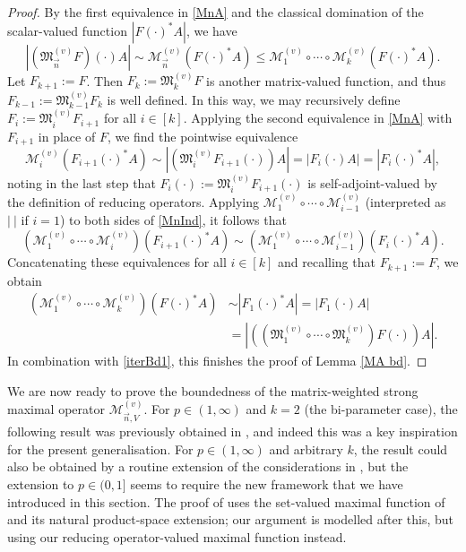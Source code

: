 \documentclass[11pt, reqno]{amsart}
\theoremstyle{definition}
\theoremstyle{remark}
\numberwithin{equation}{section}
\newcommand{\M}{\mathfrak M}
\newcommand{\vn}{\vec n}
\newcommand{\abs}[1]{|#1|}
\begin{document}
\begin{proof}
By the first equivalence in \eqref{MnA} and the classical domination of the scalar-valued function $\abs{F(\cdot)^*A}$, we have
\begin{equation}\label{iterBd1}
\abs{(\M_{\vn}^{(v)}F)(\cdot)A}
\sim \mathcal M_{\vn}^{(v)}(F(\cdot)^*A)
\leq \mathcal M_1^{(v)}\circ\cdots\circ \mathcal M_k^{(v)}(F(\cdot)^*A).
\end{equation}
Let $F_{k+1}:=F$. Then $F_k:=\M_k^{(v)}F$ is another matrix-valued function, and thus $F_{k-1}:=\M_{k-1}^{(v)}F_k$ is well defined. In this way, we may recursively define $F_i:=\M_i^{(v)} F_{i+1}$ for all $i\in[k]$.  Applying the second equivalence in \eqref{MnA} with $F_{i+1}$ in place of $F$, we find the pointwise equivalence
\begin{equation}\label{MnInd}
\mathcal M_i^{(v)}(F_{i+1}(\cdot)^*A)\sim\abs{(\M_i^{(v)}F_{i+1}(\cdot))A}=\abs{F_i(\cdot)A}
=\abs{F_i(\cdot)^*A},
\end{equation}
noting in the last step that $F_i(\cdot):=\M_i^{(v)}F_{i+1}(\cdot)$ is self-adjoint-valued by the definition of reducing operators. Applying $\mathcal M_1^{(v)}\circ\cdots\circ \mathcal M_{i-1}^{(v)}$ (interpreted as $\abs{\ }$ if $i=1$) to both sides of \eqref{MnInd}, it follows that
\begin{equation*}
(\mathcal M_1^{(v)}\circ\cdots\circ \mathcal M_i^{(v)})(F_{i+1}(\cdot)^*A)\sim
(\mathcal M_1^{(v)}\circ\cdots\circ \mathcal M_{i-1}^{(v)})(F_i(\cdot)^*A).
\end{equation*}
Concatenating these equivalences for all $i\in[k]$ and recalling that $F_{k+1}:=F$, we obtain
\begin{align*}
(\mathcal M_1^{(v)}\circ\cdots\circ \mathcal M_k^{(v)})(F(\cdot)^*A)
&\sim\abs{F_1(\cdot)^*A}
=\abs{F_1(\cdot)A} \\
&=\abs{((\M_1^{(v)}\circ\cdots\circ \M_k^{(v)})F(\cdot))A}.
\end{align*}
In combination with \eqref{iterBd1},
this finishes the proof of Lemma \ref{MA bd}.
\end{proof}

We are now ready to prove the boundedness of the matrix-weighted strong maximal operator $\mathcal M^{(v)}_{\vn,V}$. For $p\in(1,\infty)$ and $k=2$ (the bi-parameter case), the following result was previously obtained in \cite[Theorem 3.12]{Vuo24}, and indeed this was a key inspiration for the present generalisation. For $p\in(1,\infty)$ and arbitrary $k$, the result could also be obtained by a routine extension of the
considerations in \cite{Vuo24}, but the extension to $p\in(0,1]$ seems to require the new framework that we have introduced in this section. The proof of \cite[Theorem 3.12]{Vuo24} uses the set-valued maximal function of \cite{BCU} and its natural product-space extension; our argument is modelled after this,
but using our reducing operator-valued maximal function instead.
\end{document}
